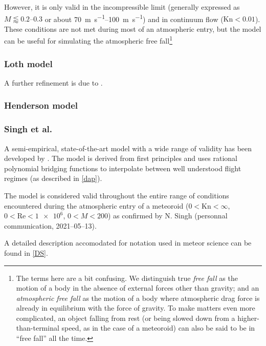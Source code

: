             However, it is only valid in the incompressible limit (generally expressed as $M \lessapprox \numrange{0.2}{0.3}$ or
            about \SIrange{70}{100}{\metre\per\second}) and in continuum flow ($\mathrm{Kn} < \num{0.01}$).
            These conditions are not met during most of an atmospheric entry,
            but the model can be useful for simulating the atmospheric free
            fall\footnote{The terms here are a bit confusing. We distinguish true \emph{free fall} as
            the motion of a body in the absence of external forces other than gravity; and an \emph{atmospheric free fall}
            as the motion of a body where atmospheric drag force is already in equilibrium
            with the force of gravity. To make matters even more complicated, an object falling from rest
            (or being slowed down from a higher-than-terminal speed, as in the case of a meteoroid)
            can also be said to be in ``free fall'' all the time.}


        \subsubsection{Loth model} \label{ddL}
            A further refinement is due to \cite{loth???}.


        \subsubsection{Henderson model} \label{ddH}

        \subsubsection{Singh et al.} \label{ddS}
            A semi-empirical, state-of-the-art model with a wide range of validity has been developed by
            \citet{singh+2020}. The model is derived from first principles and
            uses rational polynomial bridging functions to interpolate between
            well understood flight regimes (as described in \cref{dap}).

            The model is considered valid throughout the entire range of
            conditions encountered during the atmospheric entry of a meteoroid
            ($0 < \mathrm{Kn} < \infty$, $0 < \mathrm{Re} < \num{1e6}$, $0 < M < 200$)
            as confirmed by N. Singh (personnal communication, 2021--05--13).

            A detailed description accomodated for notation used in meteor science can be found in
            \cref{DS}.


